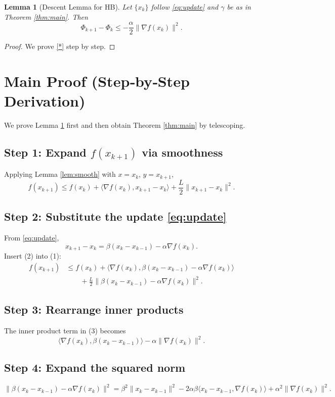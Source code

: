 \documentclass{article}
\newtheorem{lemma}{Lemma}
\newcommand{\grad}{\nabla}
\begin{document}
\begin{lemma}[Descent Lemma for HB]\label{lem:descent}
Let $\{x_k\}$ follow \eqref{eq:update} and $\gamma$ be as in Theorem \ref{thm:main}. Then
\[
\Phi_{k+1} - \Phi_k \le -\frac{\alpha}{2}\|\grad f(x_k)\|^2. \tag{*}
\]
\end{lemma}
\begin{proof}
We prove \eqref{*} step by step. \hfill\qedsymbol
\end{proof}

\section*{Main Proof (Step‑by‑Step Derivation)}
We prove Lemma \ref{lem:descent} first and then obtain Theorem \ref{thm:main} by telescoping.

\subsection*{Step 1: Expand $f(x_{k+1})$ via smoothness}
Applying Lemma \ref{lem:smooth} with $x=x_k$, $y=x_{k+1}$,
\[
f(x_{k+1}) \le f(x_k) + \langle \grad f(x_k), x_{k+1}-x_k\rangle
               + \frac{L}{2}\|x_{k+1}-x_k\|^2.
\tag{1}
\]
\subsection*{Step 2: Substitute the update \eqref{eq:update}}
From \eqref{eq:update},
\[
x_{k+1}-x_k = \beta (x_k-x_{k-1}) - \alpha \grad f(x_k).
\tag{2}
\]
Insert (2) into (1):
\[
\begin{aligned}
f(x_{k+1}) &\le f(x_k)
+ \langle \grad f(x_k), \beta (x_k-x_{k-1}) - \alpha \grad f(x_k)\rangle   \\
&\qquad + \frac{L}{2}\bigl\|\beta (x_k-x_{k-1}) - \alpha \grad f(x_k)\bigr\|^2.
\end{aligned}
\tag{3}
\]

\subsection*{Step 3: Rearrange inner products}
The inner product term in (3) becomes
\[
\langle \grad f(x_k),\beta (x_k-x_{k-1})\rangle - \alpha\|\grad f(x_k)\|^2.
\tag{4}
\]

\subsection*{Step 4: Expand the squared norm}
\[
\bigl\|\beta (x_k-x_{k-1}) - \alpha \grad f(x_k)\bigr\|^2
= \beta^2\|x_k-x_{k-1}\|^2
  -2\alpha\beta\langle x_k-x_{k-1},\grad f(x_k)\rangle
  +\alpha^2\|\grad f(x_k)\|^2.
\tag{5}
\]
\end{document}
